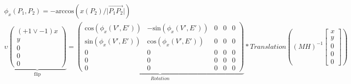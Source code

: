 \documentclass{report}
\begin{document}
\begin{align}
\phi_{x}(P_{1},P_{2}) = -\mathrm{arccos}(x(P_{2})/\lvert \overrightarrow{P_{1}P_{2}}\rvert)\\
\upsilon
\underbrace{
\begin{pmatrix}(+1 \lor -1)x \\ y \\ 0 \\ 0 \\ 0\end{pmatrix}
}_{\text{flip}}
=
\underbrace{
\begin{pmatrix}
\mathrm{cos}(\phi_{x}(V',E')) & -\mathrm{sin}(\phi_{x}(V',E')) & 0 & 0 & 0 \\
\mathrm{sin}(\phi_{x}(V',E')) & \mathrm{cos}(\phi_{x}(V',E')) & 0 & 0 & 0 \\
0 & 0 & 0 & 0 & 0 \\
0 & 0 & 0 & 0 & 0 \\
0 & 0 & 0 & 0 & 0
\end{pmatrix}
}_{Rotation}*
Translation((MH)^{-1}\begin{bmatrix} x \\ y \\ 0 \\ 0 \\ 0 \end{bmatrix})
\end{align}
\end{document}
